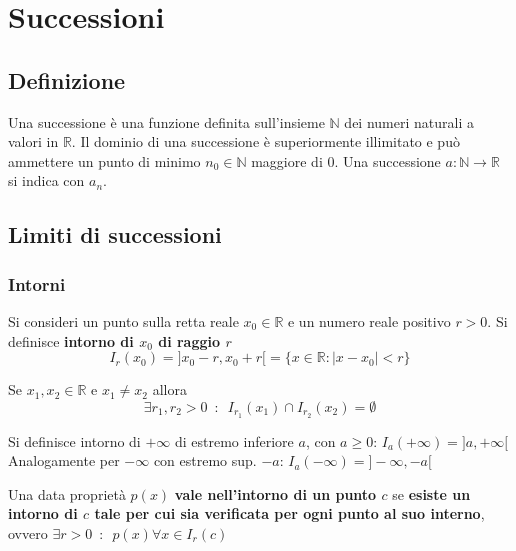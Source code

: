 \documentclass[10pt, oneside]{book}
\theoremstyle{plain}
\begin{document}
\chapter{Successioni}
\section{Definizione}
\begin{defin}
Una successione è una funzione definita sull'insieme $\mathbb{N}$ dei numeri naturali a valori in $\mathbb{R}$. Il dominio di una successione è superiormente illimitato e può ammettere un punto di minimo $n_0 \in \mathbb{N}$ maggiore di 0. Una successione $a : \mathbb{N} \rightarrow \mathbb{R}$ si indica con $a_n$.
\end{defin}

\section{Limiti di successioni}
\subsection{Intorni}
\begin{defin}
    Si consideri un punto sulla retta reale $x_0 \in \mathbb{R}$ e un numero reale positivo $r > 0$. Si definisce \textbf{intorno di $x_0$ di raggio $r$} 
    \[I_r(x_0) = ]x_0 - r, x_0 +r[ = \{x \in \mathbb{R} : |x - x_0| < r\}\]
\end{defin}
\begin{oss}
    Se $x_1, x_2 \in \mathbb{R}$ e $x_1 \neq x_2$ allora 
    \[\exists r_1, r_2 > 0 \enspace : \enspace I_{r_1}(x_1) \cap I_{r_2}(x_2) = \emptyset\]
\end{oss}

\begin{defin}
    Si definisce intorno di $+\infty$ di estremo inferiore $a$, con $a \geq 0$: $I_a(+\infty) = ]a, +\infty[$
    \\Analogamente per $-\infty$ con estremo sup. $-a$:
    $I_{a}(-\infty) = ]-\infty, -a[$
\end{defin}

Una data proprietà $p(x)$ \textbf{vale nell'intorno di un punto $c$} se \textbf{esiste un intorno di $c$ tale per cui sia verificata per ogni punto al suo interno}, ovvero $\exists r>0 \enspace : \enspace p(x) \forall x \in I_r(c)$
\end{document}
